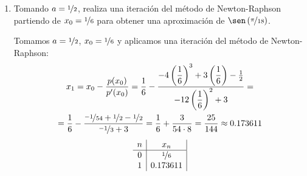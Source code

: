 \begin{ejercicio}[DGIIM 2023/2024]
\begin{enumerate}
        \item Tomando $a = \nicefrac{1}{2}$, realiza una iteración del método de Newton-Raphson partiendo de $x_0 = \nicefrac{1}{6}$ para obtener una aproximación de $\sen\left(\nicefrac{\pi}{18}\right)$.
        
        Tomamos $a=\nicefrac{1}{2}$, $x_0=\nicefrac{1}{6}$ y aplicamos una iteración del método de Newton-Raphson:
        \begin{multline*}
            x_1 = x_0 - \dfrac{p(x_0)}{p'(x_0)} = \dfrac{1}{6} - \dfrac{-4\left(\dfrac{1}{6}\right)^3 + 3\left(\dfrac{1}{6}\right) - \frac{1}{2}}{-12\left(\dfrac{1}{6}\right)^2 + 3} =\\= \dfrac{1}{6} - \dfrac{\nicefrac{-1}{54} + \nicefrac{1}{2} - \nicefrac{1}{2}}{\nicefrac{-1}{3}+3} = \dfrac{1}{6} + \frac{3}{54\cdot 8} = \frac{25}{144}\approx 0.173611
        \end{multline*}
        \begin{equation*}
            \begin{array}{c|c|c}
                n & x_n\\ \hline
                0 & \nicefrac{1}{6}\\
                1 & 0.173611
            \end{array}
        \end{equation*}
    \end{enumerate}
\end{ejercicio}